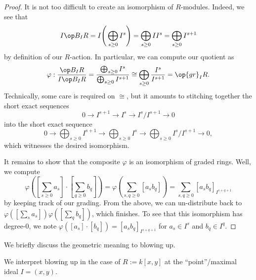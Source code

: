 \begin{proof}
	It is not too difficult to create an isomorphism of $R$-modules. Indeed, we see that
	\[I\op B_IR=I\Bigg(\bigoplus_{s\ge0}I^s\Bigg)=\bigoplus_{s\ge0}II^s=\bigoplus_{s\ge0}I^{s+1}\]
	by definition of our $R$-action. In particular, we can compute our quotient as
	\[\varphi:\frac{\op B_IR}{I\op B_IR}=\frac{\bigoplus_{s\ge0}I^s}{\bigoplus_{s\ge0}I^{s+1}}\cong\bigoplus_{s\ge0}\frac{I^s}{I^{s+1}}=\op{gr}_IR.\]
	Technically, some care is required on $\cong$, but it amounts to stitching together the short exact sequences
	\[0\to I^{s+1}\to I^s\to I^s/I^{s+1}\to0\]
	into the short exact sequence
	\[0\to\bigoplus_{s\ge0}I^{s+1}\to\bigoplus_{s\ge0}I^s\to\bigoplus_{s\ge0}I^s/I^{s+1}\to0,\]
	which witnesses the desired isomorphism.

	It remains to show that the composite $\varphi$ is an isomorphism of graded rings. Well, we compute
	\[\varphi\left(\left[\sum_{s\ge0}a_s\right]\cdot\left[\sum_{q\ge0}b_q\right]\right)=\varphi\left(\sum_{s,q\ge0}[a_sb_q]\right)=\sum_{s,q\ge0}[a_sb_q]_{I^{s+q+1}}\]
	by keeping track of our grading. From the above, we can un-distribute back to $\varphi\left(\left[\sum_sa_s\right]\right)\varphi\left(\left[\sum_qb_q\right]\right)$, which finishes. To see that this isomorphism has degree-$0$, we note $\varphi([a_s]\cdot [b_q])=[a_sb_q]_{I^{s+q+1}}$ for $a_s\in I^s$ and $b_q\in I^q$.
\end{proof}
We briefly discuss the geometric meaning to blowing up.
\begin{exe}
	We interpret blowing up in the case of $R:=k[x,y]$ at the ``point''/maximal ideal $I=(x,y)$.
\end{exe}
